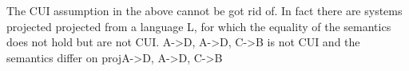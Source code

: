  The CUI assumption in the above cannot be got rid of.
 In fact there are systems projected projected from a language L,
 for which the equality of the semantics 
 does not hold but are not CUI.
 {A->D, A->D, C->B} is not CUI and the semantics differ on proj{A->D, A->D, C->B} 
% 
%
%
%
%
%
